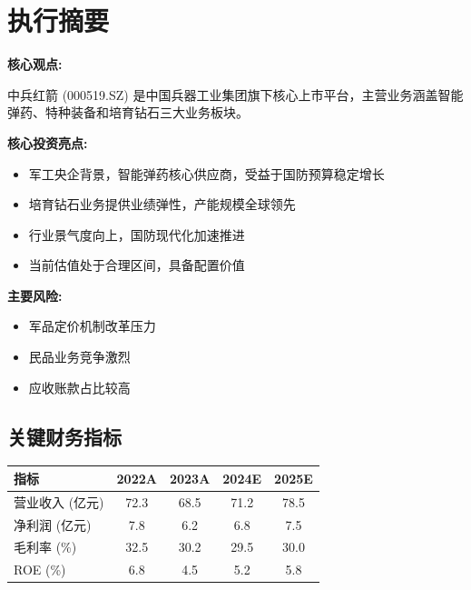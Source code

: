 \documentclass[a4paper,11pt]{article}
\begin{document}
\tableofcontents
\newpage

\section{执行摘要}

\begin{highlight}
\textbf{核心观点:}

中兵红箭 (000519.SZ) 是中国兵器工业集团旗下核心上市平台，主营业务涵盖智能弹药、特种装备和培育钻石三大业务板块。

\textbf{核心投资亮点:}
\begin{itemize}[leftmargin=*]
    \item 军工央企背景，智能弹药核心供应商，受益于国防预算稳定增长
    \item 培育钻石业务提供业绩弹性，产能规模全球领先
    \item 行业景气度向上，国防现代化加速推进
    \item 当前估值处于合理区间，具备配置价值
\end{itemize}

\textbf{主要风险:}
\begin{itemize}[leftmargin=*]
    \item 军品定价机制改革压力
    \item 民品业务竞争激烈
    \item 应收账款占比较高
\end{itemize}
\end{highlight}

\subsection*{关键财务指标}
\begin{center}
\begin{tabular}{lcccc}
    \toprule
    \rowcolor{lightbg}
    \textbf{指标} & \textbf{2022A} & \textbf{2023A} & \textbf{2024E} & \textbf{2025E} \\
    \midrule
    营业收入 (亿元) & 72.3 & 68.5 & 71.2 & 78.5 \\
    净利润 (亿元) & 7.8 & 6.2 & 6.8 & 7.5 \\
    毛利率 (\%) & 32.5 & 30.2 & 29.5 & 30.0 \\
    ROE (\%) & 6.8 & 4.5 & 5.2 & 5.8 \\
    \bottomrule
\end{tabular}
\end{center}

\newpage
\end{document}
